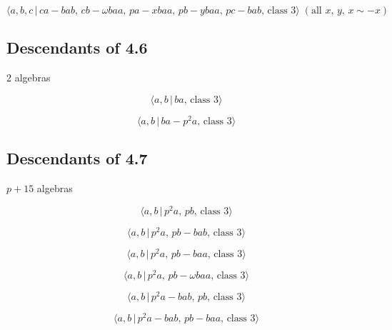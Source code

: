 \documentclass[10pt]{article}
\begin{document}
\begin{equation}
\langle a,b,c\,|\,ca-bab,\,cb-\omega baa,\,pa-xbaa,\,pb-ybaa,\,pc-bab,\,%
\text{class }3\rangle\;(\text{all }x,\,y,\, x\sim -x)  \tag{6.179}
\end{equation}

\subsection{Descendants of 4.6}

2 algebras

\begin{equation}
\langle a,b\,|\,ba,\,\text{class }3\rangle  \tag{6.366}
\end{equation}

\begin{equation}
\langle a,b\,|\,ba-p^2a,\,\text{class }3\rangle  \tag{6.367}
\end{equation}

\subsection{Descendants of 4.7}

$p+15$ algebras

\begin{equation}
\langle a,b\,|\,p^2a,\,pb,\,\text{class }3\rangle  \tag{6.368}
\end{equation}

\begin{equation}
\langle a,b\,|\,p^2a,\,pb-bab,\,\text{class }3\rangle  \tag{6.369}
\end{equation}

\begin{equation}
\langle a,b\,|\,p^2a,\,pb-baa,\,\text{class }3\rangle  \tag{6.370}
\end{equation}

\begin{equation}
\langle a,b\,|\,p^2a,\,pb-\omega baa,\,\text{class }3\rangle  \tag{6.371}
\end{equation}

\begin{equation}
\langle a,b\,|\,p^2a-bab,\,pb,\,\text{class }3\rangle  \tag{6.372}
\end{equation}

\begin{equation}
\langle a,b\,|\,p^2a-bab,\,pb-baa,\,\text{class }3\rangle  \tag{6.373}
\end{equation}
\end{document}
